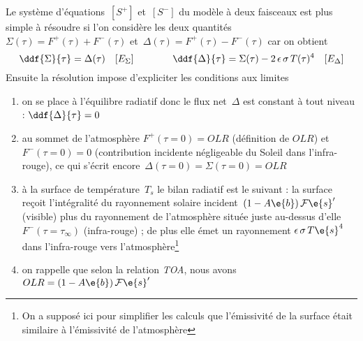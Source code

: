 \sk
Le système d'équations~$[S^+]$ et~$[S^-]$ du modèle à deux faisceaux
est plus simple à résoudre si l'on considère les deux quantités~$\Sigma(\tau)=F^{+}(\tau)+F^{-}(\tau)$ et~$\Delta(\tau)=F^{+}(\tau)-F^{-}(\tau)$ car on obtient
\[
\ddf{\Sigma}{\tau} = \Delta(\tau) \quad [E_\Sigma] 
\qquad\qquad 
\ddf{\Delta}{\tau} = \Sigma(\tau) - 2\,\epsilon\,\sigma\,T(\tau)^4 \quad [E_\Delta]
\]
\noindent Ensuite la résolution impose d'expliciter les conditions aux limites
\begin{enumerate}[$\mathcal{C}_1$]
\item on se place à l'équilibre radiatif donc le flux net~$\Delta$ est constant à tout niveau : $\ddf{\Delta}{\tau}=0$
\item au sommet de l'atmosphère $F^+(\tau=0) = OLR$ (définition de $OLR$) et $F^-(\tau=0) = 0$ (contribution
incidente négligeable du Soleil dans l'infra-rouge), ce qui s'écrit encore~$\Delta(\tau=0)=\Sigma(\tau=0)=OLR$
\item à la surface de température~$T_s$ le bilan radiatif est le suivant : la surface reçoit l'intégralité du rayonnement
solaire incident~$(1-A\e{b}) \, \mathcal{F}\e{s}'$ (visible) plus du rayonnement de l'atmosphère située
juste au-dessus d'elle~$F^-(\tau=\tau_{\infty})$ (infra-rouge) ; de plus elle émet un rayonnement
$\epsilon\,\sigma\,T\e{s}^4$ dans l'infra-rouge vers l'atmosphère\footnote{On a supposé ici pour simplifier les calculs que l'émissivité
de la surface était similaire à l'émissivité de l'atmosphère}
\item on rappelle que selon la relation \emph{TOA}, nous avons $OLR = (1-A\e{b}) \, \mathcal{F}\e{s}'$
\end{enumerate}
